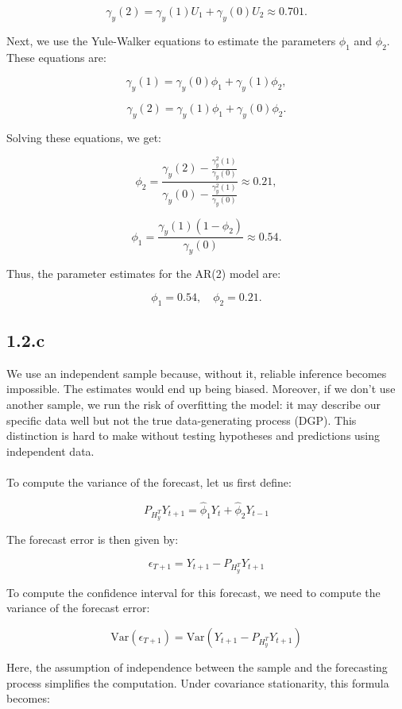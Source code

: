 \documentclass{article}
\begin{document}
\[
\gamma_{y}(2) = \gamma_{y}(1) U_{1} + \gamma_{y}(0) U_{2} \approx 0.701.
\]

Next, we use the Yule-Walker equations to estimate the parameters \( \phi_1 \) and \( \phi_2 \). These equations are:

\[
\gamma_{y}(1) = \gamma_{y}(0) \phi_{1} + \gamma_{y}(1) \phi_{2},
\]

\[
\gamma_{y}(2) = \gamma_{y}(1) \phi_{1} + \gamma_{y}(0) \phi_{2}.
\]

Solving these equations, we get:

\[
\phi_{2} = \frac{\gamma_{y}(2) - \frac{\gamma_{y}^{2}(1)}{\gamma_{y}(0)}}{\gamma_{y}(0) - \frac{\gamma_{y}^{2}(1)}{\gamma_{y}(0)}} \approx 0.21,
\]

\[
\phi_{1} = \frac{\gamma_{y}(1) (1 - \phi_{2})}{\gamma_{y}(0)} \approx 0.54.
\]

Thus, the parameter estimates for the AR(2) model are:

\[
\phi_{1} = 0.54, \quad \phi_{2} = 0.21.
\]


\subsection*{1.2.c}

We use an independent sample because, without it, reliable inference becomes impossible. 
The estimates would end up being biased. Moreover, if we don't use another sample, we run the 
risk of overfitting the model: it may describe our specific data well but not the true data-generating process (DGP). 
This distinction is hard to make without testing hypotheses and predictions using independent data.
\\
\\To compute the variance of the forecast, let us first define: 

\[
P_{H_{y}^{T}}Y_{t+1}= \hat{\phi}_{1}Y_{t}+\hat{\phi}_{2}Y_{t-1}
\]

The forecast error is then given by: 

\[
\epsilon_{T+1}=Y_{t+1}-P_{H_{y}^{T}}Y_{t+1}
\]

To compute the confidence interval for this forecast, we need to compute the variance of the forecast error:

\[
\text{Var}(\epsilon_{T+1})=\text{Var}(Y_{t+1}-P_{H_{y}^{T}}Y_{t+1})
\]

Here, the assumption of independence between the sample and the forecasting process simplifies the computation. 
Under covariance stationarity, this formula becomes:
\end{document}
